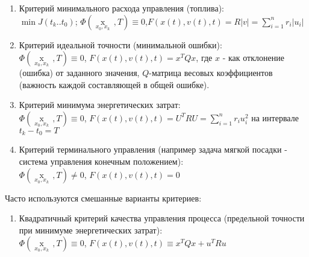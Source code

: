 \documentclass[preprint,russian,a5paper,10pt,twoside]{ncc}
\begin{document}
\begin{itemize}
\begin{enumerate}
\begin{itemize}
\end{itemize}
\item Критерий минимального расхода управления (топлива): 
\\\begin{math}\min J\left( {{t}_{k}}..{{t}_{0}} \right)\end{math}; $\Phi \left( \underset{{{x}_{0}},{{x}_{k}}}{\mathop{x\left( T \right)}}\,,T \right)\equiv 0$,$F\left( x\left( t \right),v\left( t \right),t \right)=R\left| v \right|=\sum\limits_{i=1}^{n}{{{r}_{i}}}\left| {{u}_{i}} \right|$
\item Критерий идеальной точности (минимальной ошибки):\\\begin{math}\Phi \left( \underset{{{x}_{0}},{{x}_{k}}}{\mathop{x\left( T \right)}}\,,T \right)\equiv 0\end{math}, \begin{math}F\left( x\left( t \right),v\left( t \right),t \right)={{x}^{T}}Qx\end{math}, где $x$ - как отклонение (ошибка) от заданного значения, $Q$-матрица весовых коэффициентов (важность каждой составляющей в общей ошибке).
\item Критерий минимума энергетических затрат:\\\begin{math}\Phi \left( \underset{{{x}_{0}},{{x}_{k}}}{\mathop{x\left( T \right)}}\,,T \right)\equiv 0\end{math}, \begin{math}F\left( x\left( t \right),v\left( t \right),t \right)={{U}^{T}}RU=\sum\limits_{i=1}^{n}{{{r}_{i}}}u_{i}^{2}\end{math} на интервале ${{t}_{k}}-{{t}_{0}}=T$
\item Критерий терминального управления (например задача мягкой посадки - система управления конечным положением):\\
$\Phi \left( \underset{{{x}_{0}},{{x}_{k}}}{\mathop{x\left( T \right)}}\,,T \right)\ne 0$, $F\left( x\left( t \right),v\left( t \right),t \right)=0$
\end{enumerate}
Часто используются смешанные варианты критериев:
\begin{enumerate}[resume]
\item Квадратичный критерий качества управления процесса (предельной точности при минимуме энергетических затрат):
\\\begin{math}\Phi \left( \underset{{{x}_{0}}, {{x}_{k}}}{\mathop{x\left( T \right)}}\,,T \right)\equiv 0\end{math}, \begin{math}F\left( x\left( t \right),v\left( t \right),t \right)\equiv {{x}^{T}}Qx+{{u}^{T}}Ru\end{math}


\end{enumerate}
\end{itemize}
\end{document}
